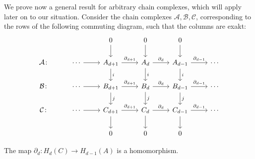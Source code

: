 We prove now a general result for arbitrary chain complexes, which will apply later on to our situation. Consider the chain complexes $\mathcal{A}, \mathcal{B}, \mathcal{C}$, corresponding to the rows of the following commuting diagram, such that the columns are exakt:
\begin{equation}
\label{commutediagram}
\begin{tikzcd}
                  &                  & 0 \arrow[d]                                        & 0 \arrow[d]                                  & 0 \arrow[d]                                        &        \\
\mathcal{A}\colon & \cdots \arrow[r] & A_{d+1} \arrow[d, "i"] \arrow[r, "\partial_{d+1}"] & A_d \arrow[d, "i"] \arrow[r, "\partial_{d}"] & A_{d-1} \arrow[d, "i"] \arrow[r, "\partial_{d-1}"] & \cdots \\
\mathcal{B}\colon & \cdots \arrow[r] & B_{d+1} \arrow[d, "j"] \arrow[r, "\partial_{d+1}"] & B_d \arrow[d, "j"] \arrow[r, "\partial_{d}"] & B_{d-1} \arrow[d, "j"] \arrow[r, "\partial_{d-1}"] & \cdots \\
\mathcal{C}\colon & \cdots \arrow[r] & C_{d+1} \arrow[d] \arrow[r, "\partial_{d+1}"]      & C_d \arrow[d] \arrow[r, "\partial_{d}"]      & C_{d-1} \arrow[d] \arrow[r, "\partial_{d-1}"]      & \cdots \\
                  &                  & 0                                                  & 0                                            & 0                                                  &       
\end{tikzcd}
\end{equation}

\begin{proposition}
	The map \(\partial_{d}: H_{d}(C) \rightarrow H_{d-1}(A)\) is a homomorphism.
\end{proposition}

